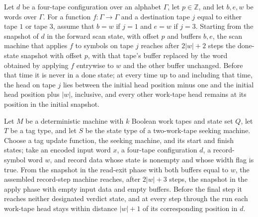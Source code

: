 \begin{theorem}
\label{Turing.recordStep_map_snapshot}
\leanok
{}
Let $d$ be a four-tape configuration over an alphabet $\Gamma$, let $p\in\mathbb Z$, and
let $b,e,w$ be words over $\Gamma$. For a function $f:\Gamma\to\Gamma$ and a destination
tape $j$ equal to either tape $1$ or tape $3$, assume that $b=w$ if $j=1$ and $e=w$ if
$j=3$. Starting from the snapshot of $d$ in the forward scan state, with offset $p$ and
buffers $b,e$, the scan machine that applies $f$ to symbols on tape $j$ reaches after
$2|w|+2$ steps the done-state snapshot with offset $p$, with that tape's buffer replaced
by the word obtained by applying $f$ entrywise to $w$ and the other buffer unchanged.
Before that time it is never in a done state; at every time up to and including that
time, the head on tape $j$ lies between the initial head position minus one and the
initial head position plus $|w|$, inclusive, and every other work-tape head remains at
its position in the initial snapshot.
\end{theorem}

\begin{theorem}
\label{Turing.recordStep_empty_run}
\leanok
{}
Let $M$ be a deterministic machine with $k$ Boolean work tapes and state set $Q$, let
$T$ be a tag type, and let $S$ be the state type of a two-work-tape seeking machine.
Choose a tag update function, the seeking machine, and its start and finish states; take
an encoded input word $x$, a four-tape configuration $d$, a record-symbol word $w$, and
record data whose state is nonempty and whose width flag is true. From the snapshot in
the read-exit phase with both buffers equal to $w$, the assembled record-step machine
reaches, after $2|w|+3$ steps, the snapshot in the apply phase with empty input data and
empty buffers. Before the final step it reaches neither designated verdict state, and at
every step through the run each work-tape head stays within distance $|w|+1$ of its
corresponding position in $d$.
\end{theorem}

